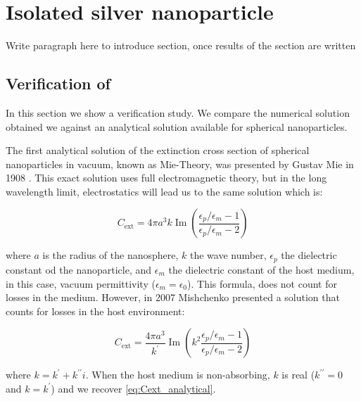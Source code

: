 
\chapter{Isolated silver nanoparticle} \label{chap:iso_silver_np}
\graphicspath{{iso_silver_np/figs/}}

{\color{red}
Write paragraph here to introduce section, once results of the 
section are written
}

\section{Verification of \pygbe} \label{sec:verification}

In this section we show a verification study. We compare the numerical solution
obtained we \pygbe against an analytical solution available for spherical 
nanoparticles. 

The first analytical solution of the extinction cross section of spherical 
nanoparticles in vacuum, known as Mie-Theory, was presented by Gustav Mie in 1908
\cite{Mie1908}. This exact solution uses full electromagnetic theory, but in the 
long wavelength limit, electrostatics will lead us to the same solution 
\cite{BohrenHuffman1983} which is:

\begin{equation} \label{eq:Cext_analytical}
    C_\text{ext} = 4\pi a^3 k \operatorname{Im}\left(\frac{\epsilon_p/\epsilon_m -1}{\epsilon_p/\epsilon_m -2}\right)
\end{equation}

\noindent where $a$ is the radius of the nanosphere, $k$ the wave number, 
$\epsilon_p$ the dielectric constant od the nanoparticle, and $\epsilon_m$ the
dielectric constant of the host medium, in this case,  vacuum permittivity
($\epsilon_m = \epsilon_0$).  This formula, does not count for losses in the medium.
However, in 2007 Mishchenko presented a solution that counts for losses in
the host environment:

\begin{equation} \label{eq:Cext_analytical_lossy}
    C_\text{ext} = \frac{4\pi a^3}{k^\prime} \operatorname{Im}\left(k^2 \frac{\epsilon_p/\epsilon_m -1}{\epsilon_p/\epsilon_m -2}\right)
\end{equation}

\noindent where $k=k^\prime + k^{\prime\prime}i$. When the host medium is 
non-absorbing, $k$ is real ($k^{\prime\prime} = 0$ and $k=k^\prime$) and we 
recover \eqref{eq:Cext_analytical}. 

